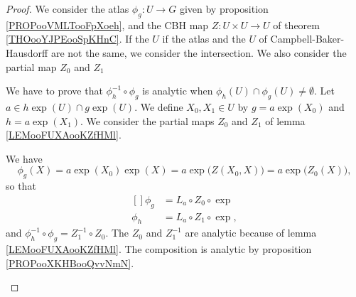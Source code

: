 \begin{proof}
	We consider the atlas \(\phi_g \colon U\to G  \) given by proposition \ref{PROPooVMLTooFpXoeh}, and the CBH map \(Z \colon U\times U\to U  \) of theorem \ref{THOooYJPEooSpKHnC}. If the \( U\) if the atlas and the \( U\) of Campbell-Baker-Hausdorff are not the same, we consider the intersection.
	We also consider the partial map \( Z_0\) and \( Z_1\)

	\begin{subproof}
		We have to prove that \( \phi^{-1}_h\circ \phi_g\) is analytic when \( \phi_h(U)\cap \phi_g(U)\neq \emptyset\). Let \( a\in h \exp(U)\cap g\exp(U)\). We define \( X_0,X_1\in U\) by \( g=a\exp(X_0)\) and \( h=a\exp(X_1)\). We consider the partial maps \( Z_0\) and \( Z_1\) of lemma \ref{LEMooFUXAooKZfHMl}.

		We have
		\begin{equation}
			\phi_g(X)=a\exp(X_0)\exp(X)=a\exp\big( Z(X_0,X) \big)=a\exp\big( Z_0(X) \big),
		\end{equation}
		so that
		\begin{equation}
			\begin{aligned}[]
				\phi_g & =L_a\circ Z_0\circ \exp  \\
				\phi_h & =L_a\circ Z_1\circ \exp,
			\end{aligned}
		\end{equation}
		and \( \phi_h^{-1}\circ\phi_g=Z_1^{-1}\circ Z_0\). The \( Z_0\) and \( Z_1^{-1}\) are analytic because of lemma \ref{LEMooFUXAooKZfHMl}. The composition is analytic by proposition \ref{PROPooXKHBooQvvNmN}.


\end{subproof}
\end{proof}
